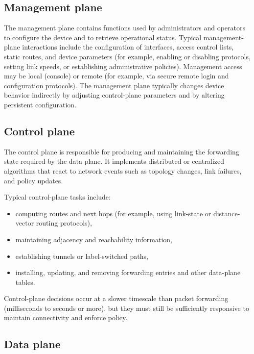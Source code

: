 \documentclass[11pt,a4paper,openany]{report}
\begin{document}
\subsection{Management plane}

The management plane contains functions used by administrators and operators to configure the device and to retrieve operational status. Typical management-plane interactions include the configuration of interfaces, access control lists, static routes, and device parameters (for example, enabling or disabling protocols, setting link speeds, or establishing administrative policies). Management access may be local (console) or remote (for example, via secure remote login and configuration protocols). The management plane typically changes device behavior indirectly by adjusting control-plane parameters and by altering persistent configuration.

\subsection{Control plane}

The control plane is responsible for producing and maintaining the forwarding state required by the data plane. It implements distributed or centralized algorithms that react to network events such as topology changes, link failures, and policy updates.

Typical control-plane tasks include:

\begin{itemize}
\item computing routes and next hops (for example, using link-state or distance-vector routing protocols),
\item maintaining adjacency and reachability information,
\item establishing tunnels or label-switched paths,
\item installing, updating, and removing forwarding entries and other data-plane tables.
\end{itemize}

Control-plane decisions occur at a slower timescale than packet forwarding (milliseconds to seconds or more), but they must still be sufficiently responsive to maintain connectivity and enforce policy.

\subsection{Data plane}
\end{document}
